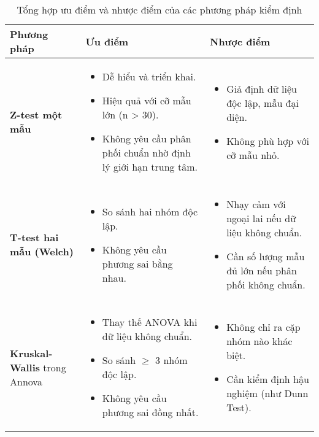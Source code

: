 \begin{table}[H]
\centering
\caption{Tổng hợp ưu điểm và nhược điểm của các phương pháp kiểm định}
\label{tab:summary_tests}
\renewcommand{\arraystretch}{1} %
\begin{tabular}{|p{3.2cm}|p{5.5cm}|p{5.5cm}|}
    
\hline
\textbf{Phương pháp} & \textbf{Ưu điểm} & \textbf{Nhược điểm} \\ \hline
\textbf{Z-test một mẫu} &
\begin{itemize}[leftmargin=*, topsep=0pt, partopsep=0pt, parsep=0pt, itemsep=0pt]
\item Dễ hiểu và triển khai.
    \item Hiệu quả với cỡ mẫu lớn (n > 30).
    \item Không yêu cầu phân phối chuẩn nhờ định lý giới hạn trung tâm.
\end{itemize} &
\begin{itemize}[leftmargin=*, topsep=0pt, partopsep=0pt, parsep=0pt, itemsep=0pt]
    \item Giả định dữ liệu độc lập, mẫu đại diện.
    \item Không phù hợp với cỡ mẫu nhỏ.
\end{itemize} \\ \hline
\textbf{T-test hai mẫu (Welch)} &
\begin{itemize}[leftmargin=*, topsep=0pt, partopsep=0pt, parsep=0pt, itemsep=0pt]
    \item So sánh hai nhóm độc lập.
    \item Không yêu cầu phương sai bằng nhau.
\end{itemize} &
\begin{itemize}[leftmargin=*, topsep=0pt, partopsep=0pt, parsep=0pt, itemsep=0pt]
    \item Nhạy cảm với ngoại lai nếu dữ liệu không chuẩn.
    \item Cần số lượng mẫu đủ lớn nếu phân phối không chuẩn.
\end{itemize} \\ \hline
\textbf{Kruskal-Wallis } trong Annova &
\begin{itemize}[leftmargin=*, topsep=0pt, partopsep=0pt, parsep=0pt, itemsep=0pt]
    \item Thay thế ANOVA khi dữ liệu không chuẩn.
    \item So sánh $\geq$ 3 nhóm độc lập.
    \item Không yêu cầu phương sai đồng nhất.
\end{itemize} &
\begin{itemize}[leftmargin=*, topsep=0pt, partopsep=0pt, parsep=0pt, itemsep=0pt]
    \item Không chỉ ra cặp nhóm nào khác biệt.
    \item Cần kiểm định hậu nghiệm (như Dunn Test).
\end{itemize} \\ \hline

\end{tabular}
\end{table}
